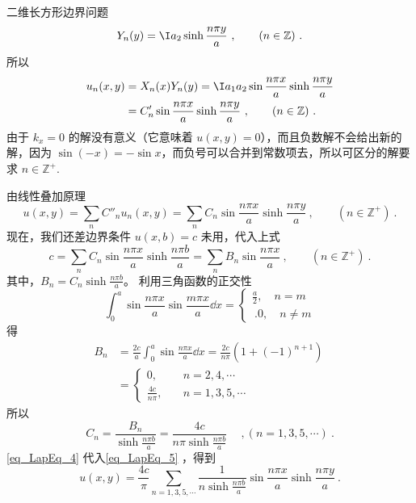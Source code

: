 \begin{example}{二维长方形边界问题}
\begin{equation}
Y_n(y)=\I a_2\sinh\frac{n\pi y}{a}~,\qquad (n\in \mathbb{Z})~.
\end{equation}
所以
\begin{equation}
\begin{aligned}
u_n(x,y)&=X_n(x)Y_n(y)=\I a_1a_2\sin\frac{n\pi x}{a}\sinh\frac{n\pi y}{a}\\
&=C'_n\sin\frac{n\pi x}{a}\sinh\frac{n\pi y}{a}~, \qquad (n\in\mathbb{Z})~.
\end{aligned}
\end{equation}
由于 $k_x=0$ 的解没有意义（它意味着 $u(x,y)=0$），而且负数解不会给出新的解，因为 $\sin(-x)=-\sin x$，而负号可以合并到常数项去，所以可区分的解要求 $n\in\mathbb{Z^+}$.

由线性叠加原理
\begin{equation}\label{eq_LapEq_5}
u(x,y)=\sum_n C''_n u_n(x,y)=\sum_n C_n\sin\frac{n\pi x}{a}\sinh\frac{n\pi y}{a}~, \qquad  (n\in\mathbb{Z^+})~.
\end{equation}
现在，我们还差边界条件 $u(x,b)=c$ 未用，代入上式
\begin{equation}
c=\sum_n C_n\sin\frac{n\pi x}{a}\sinh\frac{n\pi b}{a}=\sum_n B_n\sin\frac{n\pi x}{a} ~,\qquad (n\in\mathbb{Z^+})~.
\end{equation}
其中，$B_n=C_n\sinh \frac{n\pi b}{a}$。
利用三角函数的正交性
\begin{equation}
\int_0^a\sin\frac{n\pi x}{a}\sin\frac{m\pi x}{a}\dd x=\left\{\begin{aligned}
\frac{a}{2},\quad  n=m\\~.
0,\quad n\neq m
\end{aligned}\right.
\end{equation}
得
\begin{equation}
\begin{aligned}
B_n&=\frac{2c}{a}\int_0^a\sin\frac{n\pi x}{a}\dd x=\frac{2c}{n\pi}(1+(-1)^{n+1})\\
&=\left\{\begin{aligned}
0,&\quad n=2,4,\cdots\\
\frac{4c}{n\pi},&\quad n=1,3,5,\cdots
\end{aligned}\right.
\end{aligned}~
\end{equation}
所以
\begin{equation}\label{eq_LapEq_4}
C_n=\frac{B_n}{\sinh \frac{n\pi b}{a}}=\frac{4c}{n\pi\sinh \frac{n\pi b}{a}}\quad
~,(n=1,3,5,\cdots)~.
\end{equation}
\autoref{eq_LapEq_4} 代入\autoref{eq_LapEq_5} ，得到
\begin{equation}
u(x,y)=\frac{4c}{\pi}\sum_{n=1,3,5,\cdots} \frac{1}{n\sinh \frac{n\pi b}{a}}\sin\frac{n\pi x}{a}\sinh\frac{n\pi y}{a}~.
\end{equation}
\end{example}
